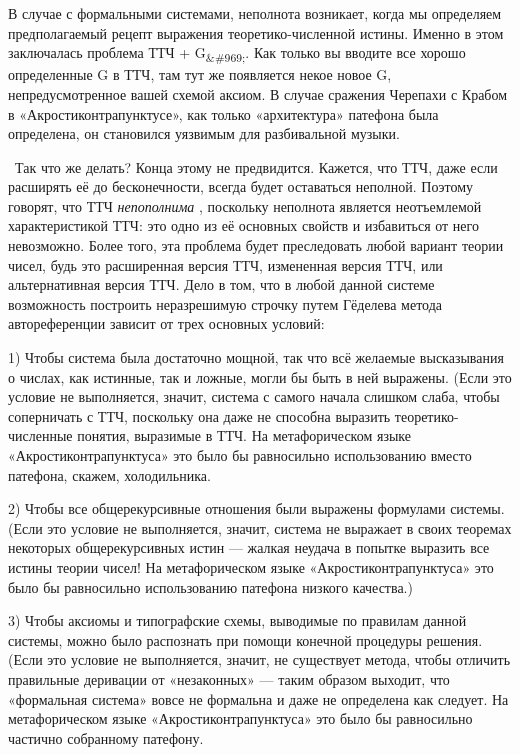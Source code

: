 \documentclass[../main.tex]{subfiles}
\begin{document}
В случае с формальными системами, неполнота возникает, когда мы определяем предполагаемый рецепт выражения теоретико-численной истины. Именно в этом заключалась проблема ТТЧ + G\textsubscript{\&\#969;}. Как только вы вводите все хорошо определенные G в ТТЧ, там тут же появляется некое новое G, непредусмотренное вашей схемой аксиом. В случае сражения Черепахи с Крабом в «Акростиконтрапунктусе», как только «архитектура» патефона была определена, он становился уязвимым для разбивальной музыки.

~Так что же делать? Конца этому не предвидится. Кажется, что ТТЧ, даже если расширять её до бесконечности, всегда будет оставаться неполной. Поэтому говорят, что ТТЧ \emph{непополнима} , поскольку неполнота является неотъемлемой характеристикой ТТЧ: это одно из её основных свойств и избавиться от него невозможно. Более того, эта проблема будет преследовать любой вариант теории чисел, будь это расширенная версия ТТЧ, измененная версия ТТЧ, или альтернативная версия ТТЧ\@. Дело в том, что в любой данной системе возможность построить неразрешимую строчку путем Гёделева метода автореференции зависит от трех основных условий:

1) Чтобы система была достаточно мощной, так что всё желаемые высказывания о числах, как истинные, так и ложные, могли бы быть в ней выражены. (Если это условие не выполняется, значит, система с самого начала слишком слаба, чтобы соперничать с ТТЧ, поскольку она даже не способна выразить теоретико-численные понятия, выразимые в ТТЧ\@. На метафорическом языке «Акростиконтрапунктуса» это было бы равносильно использованию вместо патефона, скажем, холодильника.

2) Чтобы все общерекурсивные отношения были выражены формулами системы. (Если это условие не выполняется, значит, система не выражает в своих теоремах некоторых общерекурсивных истин --- жалкая неудача в попытке выразить все истины теории чисел! На метафорическом языке «Акростиконтрапунктуса» это было бы равносильно использованию патефона низкого качества.)

3) Чтобы аксиомы и типографские схемы, выводимые по правилам данной системы, можно было распознать при помощи конечной процедуры решения. (Если это условие не выполняется, значит, не существует метода, чтобы отличить правильные деривации от «незаконных» --- таким образом выходит, что «формальная система» вовсе не формальна и даже не определена как следует. На метафорическом языке «Акростиконтрапунктуса» это было бы равносильно частично собранному патефону.
\end{document}
